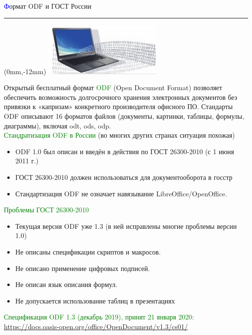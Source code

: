 \documentclass[9pt]{beamer}
\begin{document}
	\begin{frame}
	\begin{flushright}
	\vspace{1em}
		\large{\textcolor{blue}{Ф}ормат ODF и ГОСТ России}
		\\ \rule{10cm}{0.4pt}
	\end{flushright}
	\begin{textblock*}{0mm}(0mm,-12mm)
		\includegraphics[scale=0.7]{balakshin.png}
	\end{textblock*}
	\vspace{2em}
	Открытый бесплатный формат \textcolor{green}{ODF} (Open Document Format) позволяет обеспечить возможность
долгосрочного хранения электронных документов без привязки к «капризам» конкретного
производителя офисного ПО. Стандарты ODF описывают 16 форматов файлов (документы,
картинки, таблицы, формулы, диаграммы), включая odt, ods, odp.\\
\textcolor{green}{Стандратизация ODF в России} (во многих других странах ситуация похожая)
	\begin{itemize}
	\item ODF 1.0 был описан и введён в действия по ГОСТ 26300-2010 (с 1 июня 2011 г.)
\item ГОСТ 26300-2010 должен использоваться для документооборота в госстр
\item Стандартизация ODF не означает навязывание LibreOffice/OpenOffice.
	\end{itemize}
\textcolor{green}{Проблемы ГОСТ 26300-2010}
	\begin{itemize}
	\item Текущая версия ODF уже 1.3 (в ней исправлены многие проблемы версии 1.0)
\item Не описаны спецификации скриптов и макросов.
\item Не описано применение цифровых подписей.
\item Не описан язык описания формул.
\item Не допускается использование таблиц в презентациях
	\end{itemize}
	\textcolor{green}{Спецификация ODF 1.3 (декабрь 2019), принят 21 января 2020: }
	\\
	\url{https://docs.oasis-open.org/office/OpenDocument/v1.3/cs01/}
	\end{frame}
\end{document}
